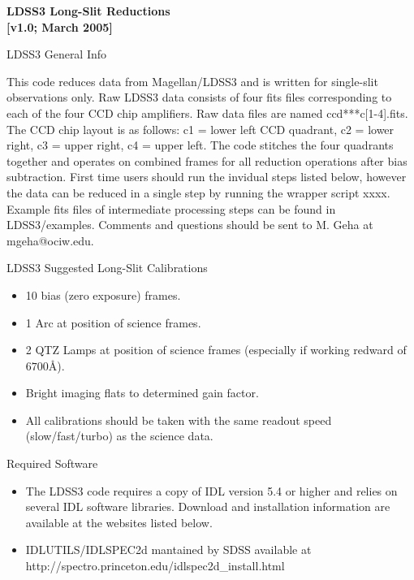 \documentclass[11pt,letterpaper,dvips]{article}
\begin{document}
 

\begin{center}
{{\Huge \bf LDSS3 Long-Slit Reductions}}\\
{{\Huge \bf [v1.0; March 2005]}}
\end{center}


\begin{enumerate}
{\Large \bf \item LDSS3 General Info} 

This code reduces data from Magellan/LDSS3 and is written for
single-slit observations only.  Raw LDSS3 data consists of four fits
files corresponding to each of the four CCD chip amplifiers. Raw data
files are named ccd***c[1-4].fits.  The CCD chip layout is as follows:
c1 = lower left CCD quadrant, c2 = lower right, c3 = upper right, c4 =
upper left.  The code stitches the four quadrants together and
operates on combined frames for all reduction operations after bias
subtraction.  First time users should run the invidual steps listed
below, however the data can be reduced in a single step by running the
wrapper script xxxx.  Example fits files of intermediate processing
steps can be found in LDSS3/examples.  Comments and questions should
be sent to M. Geha at mgeha@ociw.edu.


{\Large  \bf \item LDSS3 Suggested Long-Slit Calibrations}

   \begin{itemize}
	\item 10 bias (zero exposure) frames.
	\item 1 Arc at position of science frames.
	\item 2 QTZ Lamps at position of science frames (especially if working
	  redward of $6700\mbox{\AA}$).
	\item Bright imaging flats to determined gain factor.
	\item All calibrations should be taken with the same readout
	  speed (slow/fast/turbo) as the science data.

   \end{itemize}   


{\Large \bf \item Required Software } 
  \begin{itemize}
     \item The LDSS3 code requires a copy of IDL version 5.4 or higher
      and relies on several IDL software libraries.  Download and
      installation information are available at the websites listed below.
	\item  IDLUTILS/IDLSPEC2d mantained by SDSS available at\\
	http://spectro.princeton.edu/idlspec2d\_install.html


\end{itemize}
\end{enumerate}
\end{document}
